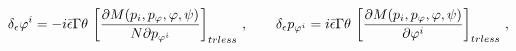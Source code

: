 \begin{equation}\label{6}
\delta_\epsilon\varphi^i=-i\bar\epsilon\Gamma\theta\,
\left[{{\partial M(p_i,p_{\varphi},\varphi,\psi)}\over{N\partial
p_{\varphi^i}}}\right]_{trless}\,, \qquad \delta_\epsilon
p_{\varphi^i}=i\bar\epsilon\Gamma\theta\, \left[{{\partial
M(p_i,p_{\varphi},\varphi,\psi)}\over{\partial
\varphi^i}}\right]_{trless}\,,
\end{equation}

